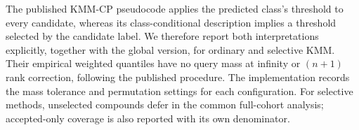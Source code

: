 The published KMM-CP pseudocode applies the predicted class's threshold to every candidate, whereas its class-conditional description implies a threshold selected by the candidate label. We therefore report both interpretations explicitly, together with the global version, for ordinary and selective KMM. Their empirical weighted quantiles have no query mass at infinity or $(n+1)$ rank correction, following the published procedure. The implementation records the mass tolerance and permutation settings for each configuration. For selective methods, unselected compounds defer in the common full-cohort analysis; accepted-only coverage is also reported with its own denominator.

